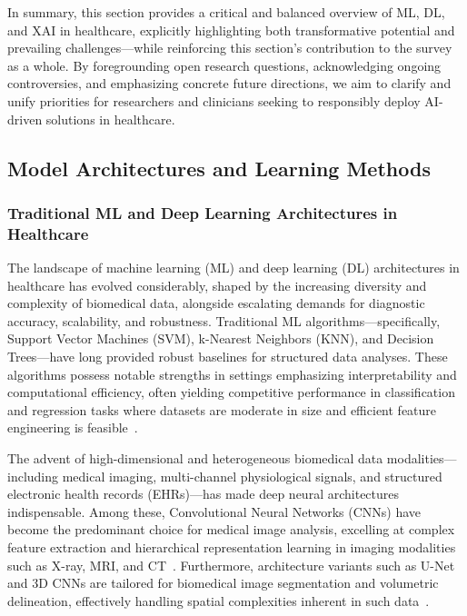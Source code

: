 \documentclass[sigconf]{acmart}
\begin{document}
In summary, this section provides a critical and balanced overview of ML, DL, and XAI in healthcare, explicitly highlighting both transformative potential and prevailing challenges—while reinforcing this section's contribution to the survey as a whole. By foregrounding open research questions, acknowledging ongoing controversies, and emphasizing concrete future directions, we aim to clarify and unify priorities for researchers and clinicians seeking to responsibly deploy AI-driven solutions in healthcare.

\subsection{Model Architectures and Learning Methods}

\subsubsection{Traditional ML and Deep Learning Architectures in Healthcare}

The landscape of machine learning (ML) and deep learning (DL) architectures in healthcare has evolved considerably, shaped by the increasing diversity and complexity of biomedical data, alongside escalating demands for diagnostic accuracy, scalability, and robustness. Traditional ML algorithms—specifically, Support Vector Machines (SVM), k-Nearest Neighbors (KNN), and Decision Trees—have long provided robust baselines for structured data analyses. These algorithms possess notable strengths in settings emphasizing interpretability and computational efficiency, often yielding competitive performance in classification and regression tasks where datasets are moderate in size and efficient feature engineering is feasible~\cite{ref16, ref28}.

The advent of high-dimensional and heterogeneous biomedical data modalities—including medical imaging, multi-channel physiological signals, and structured electronic health records (EHRs)—has made deep neural architectures indispensable. Among these, Convolutional Neural Networks (CNNs) have become the predominant choice for medical image analysis, excelling at complex feature extraction and hierarchical representation learning in imaging modalities such as X-ray, MRI, and CT~\cite{ref28, ref31, ref50, ref55, ref70, ref71, ref72, ref74, ref75, ref90, ref107}. Furthermore, architecture variants such as U-Net and 3D CNNs are tailored for biomedical image segmentation and volumetric delineation, effectively handling spatial complexities inherent in such data~\cite{ref49, ref50, ref56, ref53}.
\end{document}
